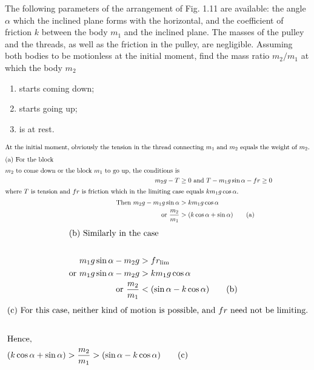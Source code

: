 \item The following parameters of the arrangement of Fig. 1.11 are available: the angle $\alpha$ which the inclined plane forms with the horizontal, and the coefficient of friction $k$ between the body $m_1$ and the inclined plane. The masses of the pulley and the threads, as well as the friction in the pulley, are negligible. Assuming both bodies to be motionless at the initial moment, find the mass ratio $m_2/m_1$ at which the body $m_2$
    \begin{enumerate}
        \item starts coming down;
        \item starts going up;
        \item is at rest.
    \end{enumerate}


\begin{solution}
    \begin{center}
    \end{center}
    
    \begin{align*}
        \intertext{At the initial moment, obviously the tension in the thread connecting $m_1$ and $m_2$ equals the weight of $m_2$.}
        \intertext{(a) For the block } m_2 \text{ to come down or the block } m_1 \text{ to go up, the conditions is} \\
        m_2g - T &\geq 0 \text{ and } T - m_1g \sin \alpha - fr \geq 0 \\
        \intertext{where $T$ is tension and $fr$ is friction which in the limiting case equals $km_1g \cos \alpha$.}
        \text{Then } m_2g - m_1g \sin \alpha &> km_1g \cos \alpha \\
        \text{or } \dfrac{m_2}{m_1} &> (k \cos \alpha + \sin \alpha) \tag{a}
    \end{align*}
    \begin{align*}
        \intertext{(b) Similarly in the case} \\
        m_1g \sin \alpha - m_2g &> fr_{\lim} \\
        \text{or } m_1g \sin \alpha - m_2g &> km_1g \cos \alpha \\
        \text{or } \dfrac{m_2}{m_1} &< (\sin \alpha - k \cos \alpha) \tag{b}
    \end{align*}
    \begin{align*}
        \intertext{(c) For this case, neither kind of motion is possible, and $fr$ need not be limiting.} \\
        \intertext{Hence, } (k \cos \alpha + \sin \alpha) &> \dfrac{m_2}{m_1} > (\sin \alpha - k \cos \alpha) \tag{c}
    \end{align*}
\end{solution}
